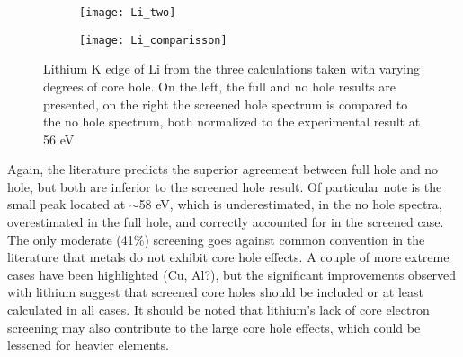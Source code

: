 \begin{figure}
	\centering
	\begin{subfigure}{0.45\textwidth}
		\texttt{[image: Li\_two]}
	\end{subfigure}
	\hfill
	\begin{subfigure}{0.45\textwidth}
		\texttt{[image: Li\_comparisson]}
	\end{subfigure}

	\caption{Lithium K edge of Li from the three calculations taken with varying degrees of core hole. On the left, the full and no hole results are presented, on the right the screened hole spectrum is compared to the no hole spectrum, both normalized to the experimental result at 56 eV }
	\label{Li_spectra}
\end{figure}


Again, the literature predicts the superior agreement between full hole and no hole, but both are inferior to the screened hole result.  Of particular note is the small peak located at $ \sim$58 eV, which is underestimated, in the no hole spectra, overestimated in the full hole, and correctly accounted for in the screened case.  The only moderate (41\%) screening goes against common convention in the literature that metals do not exhibit core hole effects.  A couple of more extreme cases have been highlighted  (Cu, Al?), but the significant improvements observed with lithium suggest that screened core holes should be included or at least calculated in all cases.  It should be noted that lithium's lack of core electron screening may also contribute to the large core hole effects, which could be lessened for heavier elements. 

